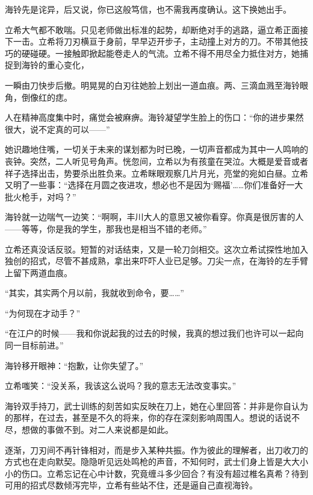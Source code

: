 \documentclass{article}
\begin{document}
海铃先是诧异，后又说，你已这般笃信，也不需我再度确认。这下换她出手。



立希大气都不敢喘。只见老师做出标准的起势，却断绝对手的逃路，逼立希正面接下一击。立希将刀刃横亘于身前，早早迈开步子，主动撞上对方的刀。不带其他技巧的硬碰硬。一接触即掀起能卷走人的气流。立希不得不用尽全力抵住对方，她捕捉到海铃的重心变化，



一瞬由刀快步后撤。明晃晃的白刃往她脸上划出一道血痕。两、三滴血溅至海铃眼角，倒像红的痣。



人在精神高度集中时，痛觉会被麻痹。海铃凝望学生脸上的伤口：“你的进步果然很大，说不定真的可以——”



她识趣地住嘴，一切关于未来的谋划都为时已晚，一切声音都成为其中一人鸣响的丧钟。突然，二人听见号角声。恍忽间，立希以为有孩童在哭泣。大概是爱音或者祥子选择出击，势要杀出胜负来。立希眯眼观察几片月光，亮堂的宛如白昼。立希又明了一些事：“选择在月圆之夜进攻，想必也不是因为‘赐福’……你们准备好一大批火枪手，对吗？”



海铃就一边喘气一边笑：“啊啊，丰川大人的意思又被你看穿。你真是很厉害的人——等等，你是我的学生，那我也是相当不错的老师。”



立希还真没话反驳。短暂的对话结束，又是一轮刀剑相交。这次立希试探性地加入独创的招式，尽管不甚成熟，拿出来吓吓人业已足够。刀尖一点，在海铃的左手臂上留下两道血痕。



“其实，其实两个月以前，我就收到命令，要……”



“为何现在才动手？”



“在江户的时候——我和你说起我的过去的时候，我真的想过我们也许可以一起向同一目标前进。”



海铃移开眼神：“抱歉，让你失望了。”



立希嗤笑：“没关系，我该这么说吗？我的意志无法改变事实。”



海铃双手持刀，武士训练的刻苦如实反映在刀上，她在心里回答：并非是你自认为的那样，在过去，甚至是不久的将来，你的存在深刻影响周围人。想说的话说不尽，想做的事做不到。对二人来说都是如此。



逐渐，刀刃间不再针锋相对，而是步入某种共振。作为彼此的理解者，出刀收刀的方式也在走向默契。隐隐听见远处鸣枪的声音，不知何时，武士们身上皆是大大小小的伤口。立希忘记在心中计数，究竟缠斗多少回合？有没有超过椎名真希？待到可用的招式尽数倾泻完毕，立希有些站不住，还是逼自己直视海铃。
\end{document}
